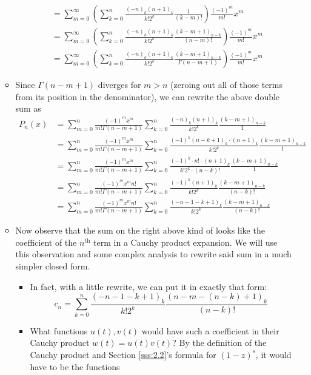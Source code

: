 \documentclass[../finalProject.tex]{subfiles}
\begin{document}
\begin{itemize}
\begin{itemize}
\begin{align*}
            &= \sum_{m=0}^\infty\left( \sum_{k=0}^n\frac{(-n)_k(n+1)_k}{k!2^k}\frac{1}{(k-m)!} \right)\frac{(-1)^m}{m!}x^m\tag*{Identity 1}\\
            &= \sum_{m=0}^\infty\left( \sum_{k=0}^n\frac{(-n)_k(n+1)_k}{k!2^k}\frac{(k-m+1)_{n-k}}{(n-m)!} \right)\frac{(-1)^m}{m!}x^m\tag*{Identity 4}\\
            &= \sum_{m=0}^\infty\left( \sum_{k=0}^n\frac{(-n)_k(n+1)_k}{k!2^k}\frac{(k-m+1)_{n-k}}{\Gamma(n-m+1)} \right)\frac{(-1)^m}{m!}x^m
        \end{align*}
        \item Since $\Gamma(n-m+1)$ diverges for $m>n$ (zeroing out all of those terms from its position in the denominator), we can rewrite the above double sum as
        \begin{align*}
            P_n(x) &= \sum_{m=0}^n\frac{(-1)^mx^m}{m!\Gamma(n-m+1)}\sum_{k=0}^n\frac{(-n)_k(n+1)_k}{k!2^k}\frac{(k-m+1)_{n-k}}{1}\\
            &= \sum_{m=0}^n\frac{(-1)^mx^m}{m!\Gamma(n-m+1)}\sum_{k=0}^n\frac{(-1)^k(n-k+1)_k\cdot(n+1)_k}{k!2^k}\frac{(k-m+1)_{n-k}}{1}\tag*{Identity 2}\\
            &= \sum_{m=0}^n\frac{(-1)^mx^m}{m!\Gamma(n-m+1)}\sum_{k=0}^n\frac{(-1)^k\cdot n!\cdot(n+1)_k}{k!2^k\cdot(n-k)!}\frac{(k-m+1)_{n-k}}{1}\tag*{Identity 1}\\
            &= \sum_{m=0}^n\frac{(-1)^mx^mn!}{m!\Gamma(n-m+1)}\sum_{k=0}^n\frac{(-1)^k(n+1)_k}{k!2^k}\frac{(k-m+1)_{n-k}}{(n-k)!}\\
            &= \sum_{m=0}^n\frac{(-1)^mx^mn!}{m!\Gamma(n-m+1)}\sum_{k=0}^n\frac{(-n-1-k+1)_k}{k!2^k}\frac{(k-m+1)_{n-k}}{(n-k)!}\tag*{Identity 2}
        \end{align*}
        \item Now observe that the sum on the right above kind of looks like the coefficient of the $n^\text{th}$ term in a Cauchy product expansion. We will use this observation and some complex analysis to rewrite said sum in a much simpler closed form.
        \begin{itemize}
            \item In fact, with a little rewrite, we can put it in exactly that form:
            \begin{equation*}
                c_n = \sum_{k=0}^n\frac{(-n-1-k+1)_k}{k!2^k}\frac{(n-m-(n-k)+1)_k}{(n-k)!}
            \end{equation*}
            \item What functions $u(t),v(t)$ would have such a coefficient in their Cauchy product $w(t)=u(t)v(t)$? By the definition of the Cauchy product and Section \ref{sss:2.2}'s formula for $(1-z)^s$, it would have to be the functions

\end{itemize}
\end{itemize}
\end{itemize}
\end{document}
